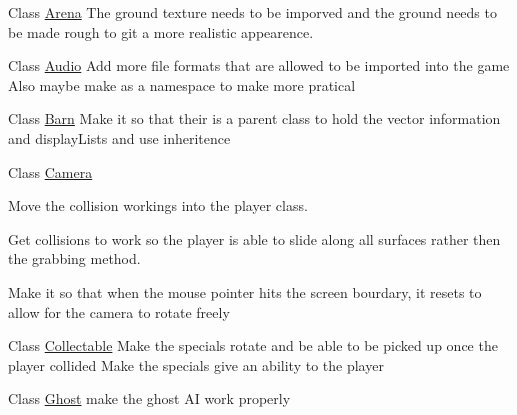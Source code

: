 \label{todo__todo000001}
\hypertarget{todo__todo000001}{}
 
\begin{DoxyDescription}
\item[Class \hyperlink{classArena}{Arena} ]The ground texture needs to be imporved and the ground needs to be made rough to git a more realistic appearence. 
\end{DoxyDescription}

\label{todo__todo000002}
\hypertarget{todo__todo000002}{}
 
\begin{DoxyDescription}
\item[Class \hyperlink{classAudio}{Audio} ]Add more file formats that are allowed to be imported into the game Also maybe make as a namespace to make more pratical 
\end{DoxyDescription}

\label{todo__todo000003}
\hypertarget{todo__todo000003}{}
 
\begin{DoxyDescription}
\item[Class \hyperlink{classBarn}{Barn} ]Make it so that their is a parent class to hold the vector information and displayLists and use inheritence 
\end{DoxyDescription}

\label{todo__todo000004}
\hypertarget{todo__todo000004}{}
 
\begin{DoxyDescription}
\item[Class \hyperlink{classCamera}{Camera} ]
\begin{DoxyItemize}
\item Move the collision workings into the player class.
\item Get collisions to work so the player is able to slide along all surfaces rather then the grabbing method.
\item Make it so that when the mouse pointer hits the screen bourdary, it resets to allow for the camera to rotate freely 
\end{DoxyItemize}
\end{DoxyDescription}

\label{todo__todo000005}
\hypertarget{todo__todo000005}{}
 
\begin{DoxyDescription}
\item[Class \hyperlink{classCollectable}{Collectable} ]Make the specials rotate and be able to be picked up once the player collided Make the specials give an ability to the player 
\end{DoxyDescription}

\label{todo__todo000006}
\hypertarget{todo__todo000006}{}
 
\begin{DoxyDescription}
\item[Class \hyperlink{classGhost}{Ghost} ]make the ghost AI work properly 
\end{DoxyDescription}